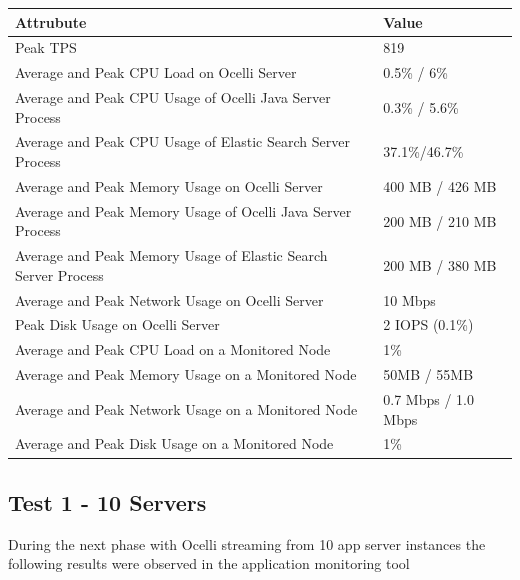 \documentclass{llncs}
\begin{document}
\begin{flushleft}
    \begin{tabular}{ | l | l |}
    \hline
  Attrubute & Value  \\ \hline
  Peak TPS & 819  \\ \hline
  Average and Peak CPU Load on Ocelli Server & 0.5\% / 6\%  \\ \hline
  Average and Peak CPU Usage of Ocelli Java Server Process & 0.3\% / 5.6\% \\ \hline
 Average and Peak CPU Usage of Elastic Search Server Process & 37.1\%/46.7\%	  \\ \hline
  Average and Peak Memory Usage on Ocelli Server & 400 MB / 426 MB	 \\ \hline
  Average and Peak Memory Usage of Ocelli Java Server Process &	200 MB / 210 MB		 \\ \hline
 Average and Peak Memory Usage of Elastic Search Server Process &	200 MB / 380 MB		 \\ \hline
Average and Peak Network Usage on Ocelli Server &	10 Mbps 	 \\ \hline
Peak Disk Usage on Ocelli Server &	2 IOPS (0.1\%) 		 \\ \hline
Average and Peak CPU Load on a Monitored Node& 	1\% 	 \\ \hline
  Average and Peak Memory Usage on a Monitored Node &	50MB / 55MB	 \\ \hline
Average and Peak Network Usage on a Monitored Node &	0.7 Mbps / 1.0 Mbps		 \\ \hline
  Average and Peak Disk Usage on a Monitored Node &  1\%	\\ 
    \hline
    \end{tabular}
\end{flushleft}

\subsection{Test 1 - 10 Servers}

During the next phase with Ocelli streaming from 10 app server instances the following results were observed in the application monitoring tool
\end{document}
